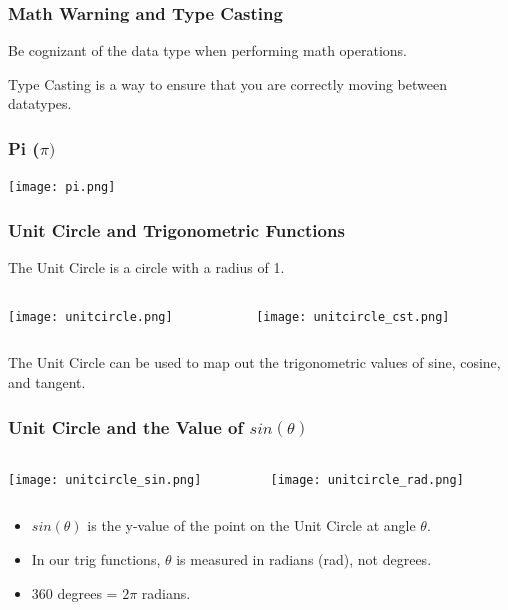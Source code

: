 \documentclass{beamer}
\begin{document}
\begin{frame}\frametitle{Math Warning and Type Casting}
Be cognizant of the data type when performing math operations. 

\lsttype

Type Casting is a way to ensure that you are correctly moving between datatypes.
\end{frame}


\begin{frame}\frametitle{Pi ($\pi)$}

\begin{center}
\texttt{[image: pi.png]}
\end{center}

\end{frame}


\begin{frame}\frametitle{Unit Circle and Trigonometric Functions}
The Unit Circle is a circle with a radius of 1.
\begin{columns}
\begin{column}{6cm}
\begin{center}
\texttt{[image: unitcircle.png]}
\end{center}
\end{column}
\begin{column}{6cm}
\begin{center}
\texttt{[image: unitcircle\_cst.png]}
\end{center}
\end{column}
\end{columns}
The Unit Circle can be used to map out the trigonometric values of sine, cosine, and tangent.
\end{frame}


\begin{frame}\frametitle{Unit Circle and the Value of $sin(\theta)$}
\begin{columns}
\begin{column}{6cm}
\begin{center}
\texttt{[image: unitcircle\_sin.png]}
\end{center}
\end{column}
\begin{column}{6cm}
\begin{center}
\texttt{[image: unitcircle\_rad.png]}
\end{center}
\end{column}
\end{columns}

\vspace{0.25cm}

\begin{itemize}
\item $sin(\theta)$ is the y-value of the point on the Unit Circle at angle $\theta$. 
\item In our trig functions, $\theta$ is measured in radians (rad), not degrees.
\item 360 degrees = $2 \pi$ radians.
\end{itemize}
\end{frame}
\end{document}
